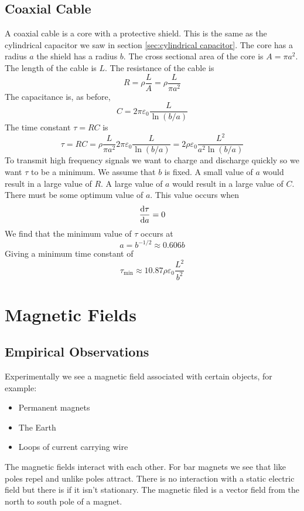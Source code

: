 \documentclass{article}
\begin{document}
    \subsection{Coaxial Cable}
    A coaxial cable is a core with a protective shield.
    This is the same as the cylindrical capacitor we saw in section \ref{sec:cylindrical capacitor}.
    The core has a radius \(a\) the shield has a radius \(b\).
    The cross sectional area of the core is \(A = \pi a^2\).
    The length of the cable is \(L\).
    The resistance of the cable is
    \[R = \rho\frac{L}{A} = \rho\frac{L}{\pi a^2}\]
    The capacitance is, as before,
    \[C = 2\pi\varepsilon_0\frac{L}{\ln(b/a)}\]
    The time constant \(\tau = RC\) is
    \[\tau = RC = \rho\frac{L}{\pi a^2} 2\pi\varepsilon_0\frac{L}{\ln(b/a)} = 2\rho\varepsilon_0\frac{L^2}{a^2\ln(b/a)}\]
    To transmit high frequency signals we want to charge and discharge quickly so we want \(\tau\) to be a minimum.
    We assume that \(b\) is fixed.
    A small value of \(a\) would result in a large value of \(R\).
    A large value of \(a\) would result in a large value of \(C\).
    There must be some optimum value of \(a\).
    This value occurs when
    \[\dv{\tau}{a} = 0\]
    We find that the minimum value of \(\tau\) occurs at
    \[a = b^{-1/2} \approx 0.606b\]
    Giving a minimum time constant of
    \[\tau_\text{min}\approx 10.87\rho \varepsilon_0 \frac{L^2}{b^2}\]
    
    \section{Magnetic Fields}
    \subsection{Empirical Observations}
    Experimentally we see a magnetic field associated with certain objects, for example:
    \begin{itemize}
        \item Permanent magnets
        \item The Earth
        \item Loops of current carrying wire
    \end{itemize}
    The magnetic fields interact with each other.
    For bar magnets we see that like poles repel and unlike poles attract.
    There is no interaction with a static electric field but there is if it isn't stationary.
    The magnetic filed is a vector field from the north to south pole of a magnet.
    
\end{document}
